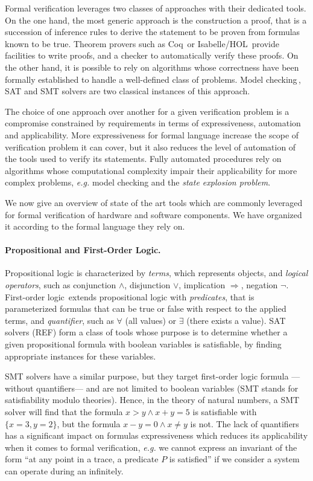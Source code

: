 Formal verification leverages two classes of approaches with their dedicated
tools.
%
On the one hand, the most generic approach is the construction a proof, that is
a succession of inference rules to derive the statement to be proven from
formulas known to be true.
%
Theorem provers such as Coq\,\cite{coq} or
Isabelle/HOL\,\cite{nipkow2002isabelle} provide facilities to write proofs, and
a checker to automatically verify these proofs.
%
On the other hand, it is possible to rely on algorithms whose correctness have
been formally established to handle a well-defined class of problems.
%
Model checking\,\cite{clarke2018modelc}, SAT and SMT solvers are
two classical instances of this approach.

The choice of one approach over another for a given verification problem is a
compromise constrained by requirements in terms of expressiveness, automation
and applicability.
%
More expressiveness for formal language increase the scope of verification
problem it can cover, but it also reduces the level of automation of the tools
used to verify its statements.
%
Fully automated procedures rely on algorithms whose computational complexity
impair their applicability for more complex problems, \emph{e.g.}  model
checking and the \emph{state explosion problem}.

We now give an overview of state of the art tools which are commonly leveraged
for formal verification of hardware and software components.
%
We have organized it according to the formal language they rely on.

\paragraph{Propositional and First-Order Logic.}
%
Propositional logic is characterized by \emph{terms}, which represents objects,
and \emph{logical operators}, such as conjunction \( \wedge \), disjunction
\( \vee \), implication \( \Rightarrow \), negation \( \neg \).
%
First-order logic\,\cite{smullyan2012fol} extends propositional logic with
\emph{predicates}, that is parameterized formulas that can be true or false with
respect to the applied terms, and \emph{quantifier}, such as \( \forall \) (all
values) or \( \exists \) (there exists a value).
%
SAT solvers (REF) form a class of tools whose purpose is to determine whether a
given propositional formula with boolean variables is satisfiable, by finding
appropriate instances for these variables.

SMT solvers have a similar purpose, but they target first-order logic formula
---without quantifiers--- and are not limited to boolean variables (SMT stands
for satisfiability modulo theories).
%
Hence, in the theory of natural numbers, a SMT solver will find that the formula
\( x > y \wedge x + y = 5 \) is satisfiable with \( \{ x = 3, y = 2 \} \), but
the formula \( x - y = 0 \wedge x \neq y \) is not.
%
The lack of quantifiers has a significant impact on formulas expressiveness
which reduces its applicability when it comes to formal verification,
\emph{e.g.} we cannot express an invariant of the form ``at any point in a
trace, a predicate \( P \) is satisfied'' if we consider a system can operate
during an infinitely.

